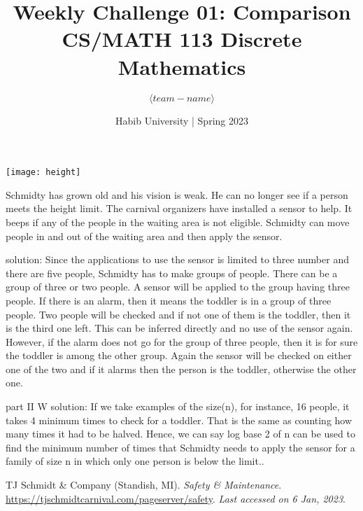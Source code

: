 \documentclass[a4paper]{exam}
\title{Weekly Challenge 01: Comparison\\CS/MATH 113 Discrete Mathematics}
\author{$\langle team-name \rangle$}  %
\date{Habib University | Spring 2023}
\begin{document}
\maketitle

\begin{questions}
  
  \begin{minipage}{.3\linewidth}
  \centerline{\texttt{[image: height]}}
\end{minipage}
  \begin{minipage}{.65\linewidth}
Schmidty \cite{schmidt} has grown old and his vision is weak. He can no longer see if a person meets the height limit. The carnival organizers have installed a sensor to help. It beeps if any of the people in the waiting area is not eligible. Schmidty can move people in and out of the waiting area and then apply the sensor.

\end{minipage}
\begin{solution}
    solution:
    Since the applications to use the sensor is limited to three number and there are five people, Schmidty has to make groups of people. There can be a group of three or two people. A sensor will be applied to the group having three people. If there is an alarm, then it means the toddler is in a group of three people. Two people will be checked and if not one of them is the toddler, then it is the third one left. This can be inferred directly and no use of the sensor again. However, if the alarm does not go for the group of three people, then it is for sure the toddler is among the other group. Again the sensor will be checked on either one of the two and if it alarms then the person is the toddler, otherwise the other one.\newline
    
    part II W
    solution:
    If we take examples of the size(n), for instance, 16 people, it takes 4 minimum times to check for a toddler. That is the same as counting how many times it had to be halved. Hence, we can say log base 2 of n can be used to find the minimum number of times that Schmidty needs to apply the sensor for  a family of size n in which only one person is below the limit..
  \end{solution}
\end{questions}

\begin{thebibliography}{9}
  TJ Schmidt \& Company (Standish, MI). \emph{Safety \& Maintenance}. \url{https://tjschmidtcarnival.com/pageserver/safety}. \textit{Last accessed on 6 Jan, 2023}.
\end{thebibliography}
\end{document}
